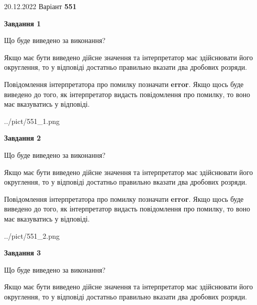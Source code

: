 \documentclass[12pt, ukrainian]{article}
\begin{document}
{20.12.2022 Варіант \No \textbf { 551 }\par}
{
\begin {Large}

{\begin {center}\textbf{Завдання 1}\end {center}}\par
Що буде виведено за виконання? \par

Якщо має бути виведено дійсне значення та інтерпретатор має здійснювати його округлення, 
то у відповіді достатньо правильно вказати два дробових розряди.

Повідомлення інтерпретатора про помилку позначати \textbf{error}.
Якщо щось буде виведено до того, як інтерпретатор видасть повідомлення про помилку, 
то воно має вказуватись у відповіді. \par

\begin{center}
	{../pict/551_1.png}
\end{center}
\newpage

{\begin {center}\textbf{Завдання 2}\end {center}}\par
Що буде виведено за виконання? \par

Якщо має бути виведено дійсне значення та інтерпретатор має здійснювати його округлення, 
то у відповіді достатньо правильно вказати два дробових розряди.

Повідомлення інтерпретатора про помилку позначати \textbf{error}.
Якщо щось буде виведено до того, як інтерпретатор видасть повідомлення про помилку, 
то воно має вказуватись у відповіді. \par

\begin{center}
	{../pict/551_2.png}
\end{center}
\newpage

{\begin {center}\textbf{Завдання 3}\end {center}}\par
Що буде виведено за виконання? \par

Якщо має бути виведено дійсне значення та інтерпретатор має здійснювати його округлення, 
то у відповіді достатньо правильно вказати два дробових розряди.


\end{Large}}
\end{document}
